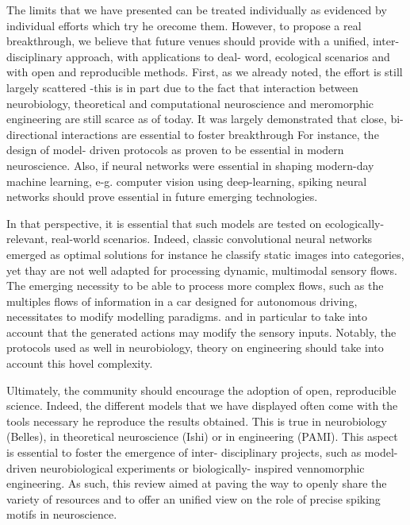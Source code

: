 \documentclass[brainsci, %
               review,submit,pdftex,moreauthors
               ]{Definitions/mdpi}
\begin{document}
The limits that we have
presented can be treated individually as evidenced by individual efforts which try he orecome them. However, to propose a real breakthrough, we believe that future venues should provide with a unified, inter-disciplinary approach, with applications to deal- word, ecological scenarios and with open and reproducible methods. First, as we already noted, the effort is still largely scattered -this is in part due to the fact that interaction between neurobiology, theoretical and computational neuroscience and meromorphic engineering are still scarce as of today. It was largely demonstrated that close, bi-directional interactions are essential to foster breakthrough For instance, the design of model- driven protocols as proven to be essential in modern neuroscience. Also, if neural networks were essential in shaping modern-day machine learning, e-g. computer vision using deep-learning, spiking neural networks should prove essential in future emerging technologies.

In that perspective, it is essential that such models are tested on ecologically- relevant, real-world scenarios. Indeed, classic convolutional neural networks emerged as optimal solutions for instance he classify static images into categories, yet thay are not well adapted for processing dynamic, multimodal sensory flows. The emerging necessity to be able to process more complex flows, such as the multiples flows of information in a car designed for autonomous driving, necessitates to modify modelling paradigms. and in particular to take into account that the generated actions may modify the sensory inputs. Notably, the protocols used as well in neurobiology, theory on engineering should take into account this hovel complexity.

Ultimately, the community should encourage the adoption of open, reproducible science. Indeed, the different models that we have displayed often come with the tools necessary he reproduce the results obtained. This is true in neurobiology (Belles), in theoretical neuroscience (Ishi) or in engineering (PAMI). This aspect is essential to foster the emergence of inter- disciplinary projects, such as model-driven neurobiological experiments or biologically- inspired vennomorphic engineering. As such, this review aimed at paving the way to openly share the variety of resources and to offer an unified view on the role of precise spiking motifs in neuroscience.

\vspace{6pt} 
\end{document}
